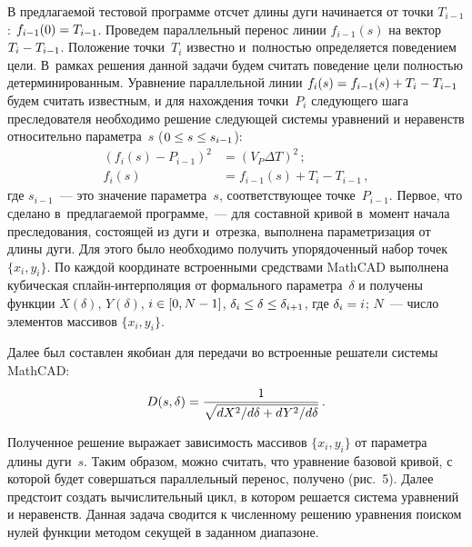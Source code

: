 \begin{multicols}{2}
   
  В предлагаемой тестовой программе отсчет длины дуги начинается от точки 
$T_{i-1}$: $f_{i-1}(0)\hm= T_{i-1}$. Проведем параллельный перенос линии 
$f_{i-1}(s)$ на вектор $T_i\hm- T_{i-1}$. Положение точки~$T_i$ известно 
и~пол\-ностью определяется поведением цели. В~рамках решения данной задачи 
будем считать поведение цели полностью детерминированным. Уравнение 
параллельной линии $f_i(s)\hm= f_{i-1}(s)\hm+ T_i\hm- T_{i-1}$ будем считать 
известным, и для нахождения точки~$P_i$ следующего шага преследователя 
необходимо решение следующей системы уравнений и неравенств 
относительно параметра~$s$ ($0\hm\leq s\hm\leq s_{i-1}$):
  \begin{align*}
  \left( f_i(s)-P_{i-1}\right)^2 &= \left( V_P \Delta T\right)^2\,;\\
  f_i(s)&=f_{i-1}(s)+T_i-T_{i-1}\,,
    \end{align*}
где $s_{i-1}$~--- это значение параметра~$s$, со\-от\-вет\-ст\-ву\-ющее точке~$P_{i-
1}$. Первое, что сделано в~пред\-ла\-га\-емой программе,~--- для со\-став\-ной кривой 
в~момент начала преследования, состоящей из дуги и~отрезка, выполнена 
параметризация от длины дуги. Для этого было необходимо получить 
упорядоченный набор точек $\{x_i, y_i\}$. По каждой координате встроенными 
средствами MathCAD выполнена кубическая сплайн-ин\-тер\-по\-ля\-ция от 
формального параметра~$\delta$ и получены функции $X(\delta)$, $Y(\delta)$, 
$i\hm\in [0,N\hm-1]$, $\delta_i\hm\leq \delta\hm\leq \delta_{i+1}$, где 
$\delta_i\hm= i$; $N$~--- число элементов массивов $\{x_i, y_i\}$.

  Далее был составлен якобиан для передачи во встроенные решатели системы 
MathCAD:
  $$
  D(s,\delta)=\displaystyle\frac{\displaystyle 1\mathstrut}{\displaystyle \sqrt{dX^2/d\delta + dY^2/d\delta}\mathstrut}\,.
  $$

  Полученное решение выражает зависимость массивов $\{x_i, y_i\}$ от 
параметра длины дуги~$s$. Таким образом, можно считать, что уравнение 
базовой кривой, с которой будет совершаться параллельный перенос, получено 
(рис.~5). Далее предстоит создать вычислительный цикл, в котором решается 
система уравнений и неравенств. Данная задача сводится к численному 
решению уравнения поиском нулей функции методом секущей в заданном 
диапазоне. 
  
      \setcounter{figure}{5}
\begin{figure*}[b] %
\vspace*{6pt}
  \begin{center}  
    \mbox{%
\epsfxsize=128.8mm
}

\end{center}
\vspace*{-6pt}
\end{figure*}  



\end{multicols}
